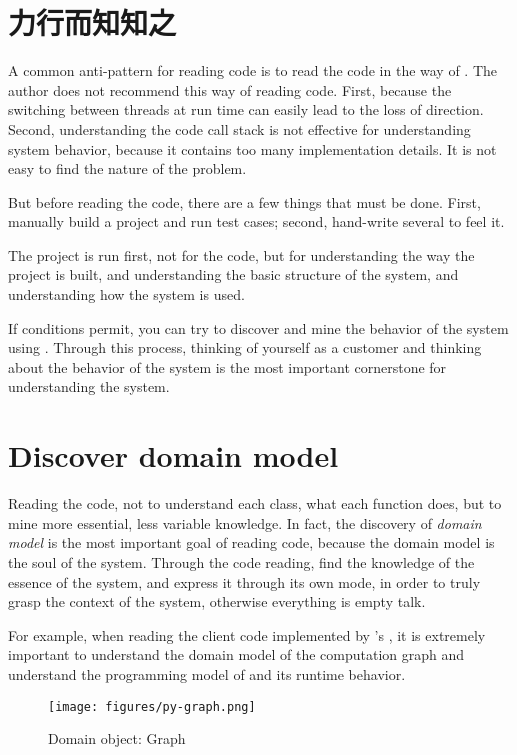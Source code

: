 \section{力行而知知之}

\begin{content}

A common anti-pattern for reading code is to read the code in the way of . The author does not recommend this way of reading code. First, because the switching between threads at run time can easily lead to the loss of direction. Second, understanding the code call stack is not effective for understanding system behavior, because it contains too many implementation details. It is not easy to find the nature of the problem.

But before reading the code, there are a few things that must be done. First, manually build a project and run test cases; second, hand-write several  to feel it.

The project is run first, not for the  code, but for understanding the way the project is built, and understanding the basic structure of the system, and understanding how the system is used.

If conditions permit, you can try to discover and mine the behavior of the system using . Through this process, thinking of yourself as a customer and thinking about the behavior of the system is the most important cornerstone for understanding the system.

\end{content}

\section{Discover domain model}

\begin{content}

Reading the code, not to understand each class, what each function does, but to mine more essential, less variable knowledge. In fact, the discovery of \emph{domain model} is the most important goal of reading code, because the domain model is the soul of the system. Through the code reading, find the knowledge of the essence of the system, and express it through its own mode, in order to truly grasp the context of the system, otherwise everything is empty talk.

For example, when reading the client code implemented by \tf{}'s , it is extremely important to understand the domain model of the computation graph and understand the programming model of  and its runtime behavior.

\begin{figure}[!htbp]
\centering
\texttt{[image: figures/py-graph.png]}
\caption{Domain object: Graph}
 \label{fig:py-graph}
\end{figure}

\end{content}

